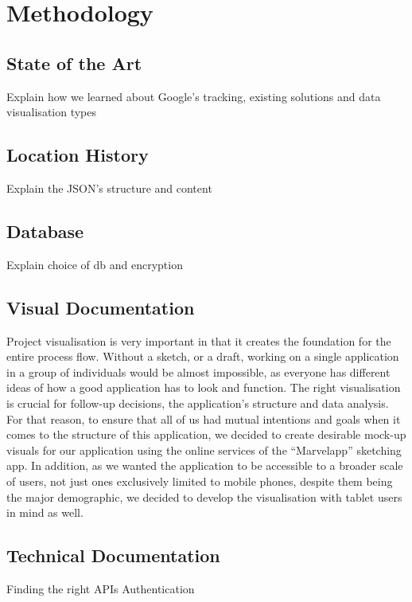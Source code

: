 \documentclass[12p]{article}
\begin{document}
		
		
		\newpage
		\section{Methodology} \label{Methodology}
		
		\subsection{State of the Art}
		Explain how we learned about Google's tracking, existing solutions and data visualisation types
		
		\subsection{Location History}
		Explain the JSON's structure and content
		
		\subsection{Database}
		Explain choice of db and encryption
		
		\subsection{Visual Documentation}
		Project visualisation is very important in that it creates the foundation for the entire process flow. Without a sketch, or a draft, working on a single application in a group of individuals would be almost impossible, as everyone has different ideas of how a good application has to look and function. The right visualisation is crucial for follow-up decisions, the application’s structure and data analysis. For that reason, to ensure that all of us had mutual intentions and goals when it comes to the structure of this application, we decided to create desirable mock-up visuals for our application using the online services of the “Marvelapp” sketching app. In addition, as we wanted the application to be accessible to a broader scale of users, not just ones exclusively limited to mobile phones, despite them being the major demographic, we decided to develop the visualisation with tablet users in mind as well.
		
		\subsection{Technical Documentation}
		Finding the right APIs
		Authentication
		
\end{document}
